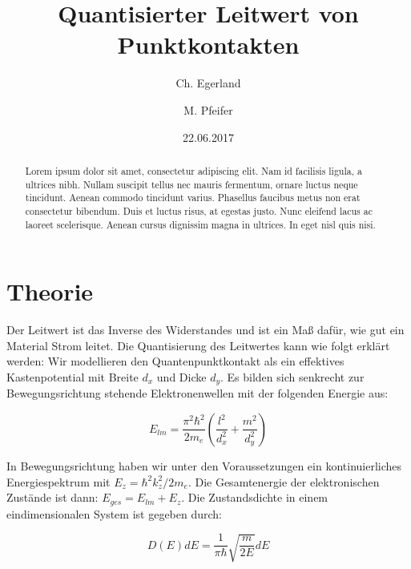 \documentclass[aps,twocolumn,secnumarabic,nobalancelastpage,amsmath,amssymb,
nofootinbib,superscriptaddress]{revtex4-1}
\begin{document}
\title{Quantisierter Leitwert von Punktkontakten}
\author         {Ch. Egerland}
\author         {M. Pfeifer}
\date[Versuchsdatum: ]{22.06.2017}

\begin{abstract}
Lorem ipsum dolor sit amet, consectetur adipiscing elit. Nam id facilisis ligula,
a ultrices nibh. Nullam suscipit tellus nec mauris fermentum, ornare luctus neque
tincidunt. Aenean commodo tincidunt varius. Phasellus faucibus metus non erat
consectetur bibendum. Duis et luctus risus, at egestas justo. Nunc eleifend lacus
ac laoreet scelerisque. Aenean cursus dignissim magna in ultrices. In eget nisl
quis nisi.
\end{abstract}


\maketitle




\section{Theorie}

Der Leitwert ist das Inverse des Widerstandes und ist ein Maß dafür, wie gut ein
Material Strom leitet. Die Quantisierung des Leitwertes kann wie folgt erklärt
werden: Wir modellieren den Quantenpunktkontakt als ein effektives Kastenpotential
mit Breite $d_x$ und Dicke $d_y$. Es bilden sich senkrecht zur Bewegungsrichtung
stehende Elektronenwellen mit der folgenden Energie aus:

  \begin{equation}
    E_{lm} = \frac{\pi^2 \hbar^2}{2 m_e} \left(\frac{l^2}{d_x^2}+\frac{m^2}{d_y^2} \right)
  \end{equation}

In Bewegungsrichtung haben wir unter den Voraussetzungen ein kontinuierliches
Energiespektrum mit $E_z = \hbar^2 k_z^2 / 2m_e$. Die Gesamtenergie der elektronischen
Zustände ist dann: $E_{ges} = E_{lm} + E_z$.
Die Zustandsdichte in einem eindimensionalen System ist gegeben durch:

  \begin{equation}
    D(E) dE = \frac{1}{\pi \hbar} \sqrt{\frac{m}{2 E}}dE
  \end{equation}
\end{document}
